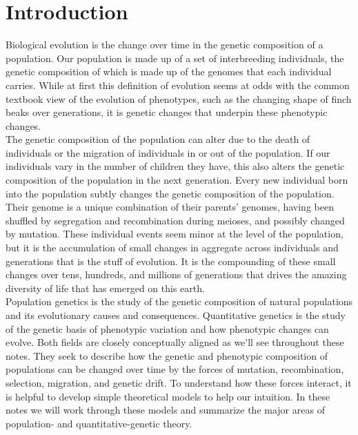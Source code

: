 \chapter{Introduction}
 Biological evolution is the change over time in the genetic composition of a population.\cite{DobzhanskyBook} Our population is made up of a set of interbreeding individuals, the genetic composition of which is made up of the  genomes that each individual carries.  While at first this definition of evolution seems at odds with the
common textbook view of the evolution of phenotypes, such as the changing shape
of finch beaks over generations, it is genetic changes that underpin these
phenotypic changes.   \\

The genetic composition of the population can alter due to the death of individuals or the migration of individuals in or out
of the population. If our individuals vary in the number of children they have, this
also alters the genetic composition of the population in the next generation.
Every new individual born into the population subtly changes the genetic
composition of the population. Their genome is a unique combination of their
parents' genomes, having been shuffled by segregation and recombination during
meioses, and possibly changed by mutation. These individual events seem minor at the level of the population, but it is the accumulation of small changes in aggregate across individuals and generations that is the stuff of evolution. It is the compounding of these small changes over tens, hundreds, and millions of generations that drives the amazing diversity of life that has emerged on this earth.\\

Population genetics is the study of the genetic composition of natural
populations and its evolutionary causes and consequences. Quantitative genetics is the study of the genetic basis of phenotypic variation and how phenotypic changes can evolve. Both fields are closely conceptually aligned as we'll see throughout these notes. They seek to describe how the genetic and phenotypic composition of populations can be changed over
time by the forces of mutation, recombination, selection, migration, and
genetic drift.  To understand how these forces interact, it is helpful to
develop simple theoretical models to help our intuition. In these notes we will
work through these models and summarize the major areas of population- and quantitative-genetic
theory.\\


